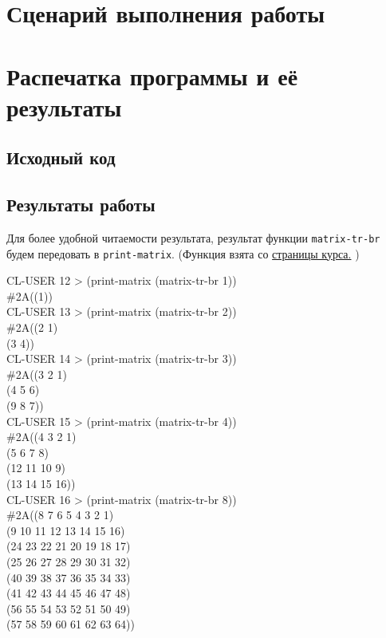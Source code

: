 \documentclass[12pt]{article}
\begin{document}
\section{Сценарий выполнения работы}

\section{Распечатка программы и её результаты}

\subsection{Исходный код}


\subsection{Результаты работы}
% 

{\large 
	Для более удобной читаемости результата, результат функции {\tt matrix-tr-br}
	будем передовать в {\tt print-matrix}. (Функция взята со \href{http://lisp.ystok.ru/fp/help.html}{страницы курса.} )

CL-USER 12 > (print-matrix (matrix-tr-br 1)) \\

\#2A((1)) \\

CL-USER 13 > (print-matrix (matrix-tr-br 2)) \\

\#2A((2 1) \\
	(3 4)) \\

CL-USER 14 > (print-matrix (matrix-tr-br 3)) \\

\#2A((3 2 1) \\
    (4 5 6) \\
    (9 8 7)) \\

CL-USER 15 > (print-matrix (matrix-tr-br 4)) \\

\#2A((4 3 2 1) \\
    (5 6 7 8) \\
    (12 11 10 9) \\
    (13 14 15 16)) \\

CL-USER 16 > (print-matrix (matrix-tr-br 8)) \\

\#2A((8 7 6 5 4 3 2 1) \\
    (9 10 11 12 13 14 15 16) \\
    (24 23 22 21 20 19 18 17) \\
    (25 26 27 28 29 30 31 32) \\
    (40 39 38 37 36 35 34 33) \\
    (41 42 43 44 45 46 47 48) \\
    (56 55 54 53 52 51 50 49) \\
    (57 58 59 60 61 62 63 64)) \\
}
\end{document}
